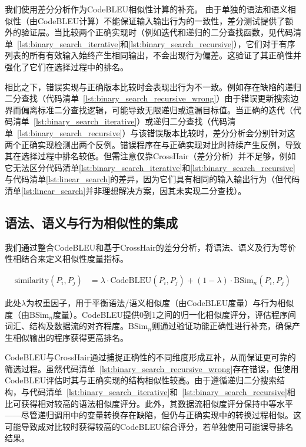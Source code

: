 \documentclass{article}
\begin{document}
\begin{CJK*}{UTF8}{gbsn}
我们使用差分分析作为CodeBLEU相似性计算的补充。
由于单独的语法和语义相似性（由CodeBLEU计算）不能保证输入输出行为的一致性，差分测试提供了额外的验证层。当比较两个正确实现时（例如迭代和递归的二分查找函数，见代码清单~\ref{lst:binary_search_iterative}和\ref{lst:binary_search_recursive}），它们对于有序列表的所有有效输入始终产生相同输出，不会出现行为偏差。这验证了其正确性并强化了它们在选择过程中的排名。

相比之下，错误实现与正确版本比较时会表现出行为不一致。例如存在缺陷的递归二分查找（代码清单~\ref{lst:binary_search_recursive_wrong}）由于错误更新搜索边界而偏离标准二分查找逻辑，可能导致无限递归或遗漏目标值。当正确的迭代（代码清单~\ref{lst:binary_search_iterative}）或递归二分查找（代码清单~\ref{lst:binary_search_recursive}）与该错误版本比较时，差分分析会分别针对这两个正确实现检测出两个反例。错误程序在与正确实现对比时持续产生反例，导致其在选择过程中排名较低。但需注意仅靠CrossHair（差分分析）并不足够，例如它无法区分代码清单\ref{lst:binary_search_iterative}和\ref{lst:binary_search_recursive}与代码清单\ref{lst:linear_search}的差异，因为它们具有相同的输入输出行为（但代码清单\ref{lst:linear_search}并非理想解决方案，因其未实现二分查找）。
\subsection{语法、语义与行为相似性的集成}

我们通过整合CodeBLEU和基于CrossHair的差分分析，将语法、语义及行为等价性相结合来定义相似性度量指标。

\begin{equation}
\label{eq:similarity}
\begin{split}
   \text{similarity}(P_i, P_j) &= \lambda \cdot \text{CodeBLEU}(P_i, P_j) + (1 - \lambda) \cdot \text{BSim}_n(P_i, P_j)
\end{split}
\end{equation}

\noindent 此处\( \lambda \)为权重因子，用于平衡语法/语义相似度（由CodeBLEU度量）与行为相似度（由BSim\(_n\)度量）。CodeBLEU提供0到1之间的归一化相似度评分，评估程序间词汇、结构及数据流的对齐程度。BSim\(_n\)则通过验证功能正确性进行补充，确保产生相似输出的程序获得更高排名。

CodeBLEU与CrossHair通过捕捉正确性的不同维度形成互补，从而保证更可靠的筛选过程。虽然代码清单~\ref{lst:binary_search_recursive_wrong}存在错误，但使用CodeBLEU评估时其与正确实现的结构相似性较高。由于遵循递归二分搜索结构，与代码清单~\ref{lst:binary_search_iterative}和~\ref{lst:binary_search_recursive}相比可获得相对较高的语法相似度评分。此外，其数据流相似度评分保持中等水平——尽管递归调用中的变量转换存在缺陷，但仍与正确实现中的转换过程相似。这可能导致成对比较时获得较高的CodeBLEU综合评分，若单独使用可能误导排名结果。


\end{CJK*}
\end{document}
